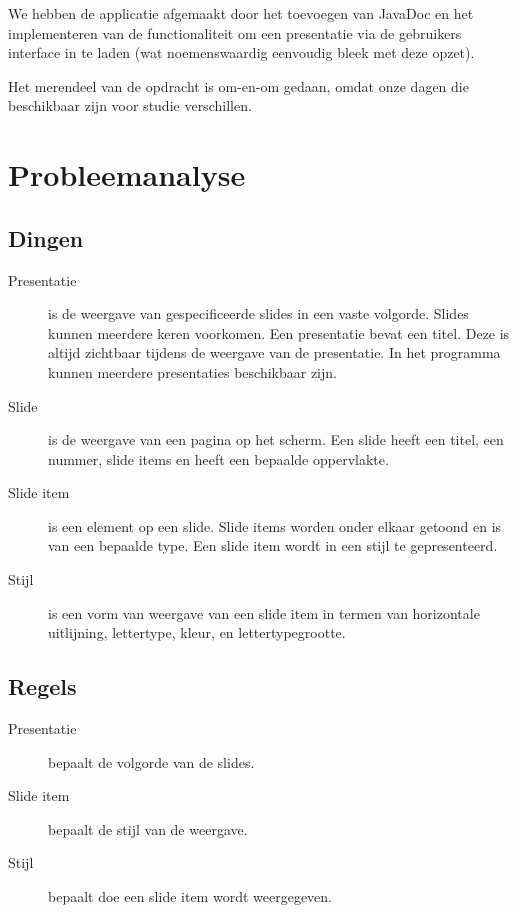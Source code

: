 \documentclass[a4paper]{article}
\begin{document}
\par
We hebben de applicatie afgemaakt door het toevoegen van JavaDoc en het implementeren van de functionaliteit om een presentatie via de gebruikers interface in te laden (wat noemenswaardig eenvoudig bleek met deze opzet).
\par
Het merendeel van de opdracht is om-en-om gedaan, omdat onze dagen die beschikbaar zijn voor studie verschillen.

\section{Probleemanalyse}
\subsection{Dingen}
\begin{description}
\item[Presentatie] is de weergave van gespecificeerde slides in een vaste volgorde. Slides kunnen meerdere keren voorkomen. Een presentatie bevat een titel. Deze is altijd zichtbaar tijdens de weergave van de presentatie. In het programma kunnen meerdere presentaties beschikbaar zijn.
\item[Slide] is de weergave van een pagina op het scherm. Een slide heeft een titel, een nummer, slide items en heeft een bepaalde oppervlakte.
\item[Slide item] is een element op een slide. Slide items worden onder elkaar getoond en is van een bepaalde type.
Een slide item wordt in een stijl te gepresenteerd.
\item[Stijl] is een vorm van weergave van een slide item in termen van horizontale uitlijning, lettertype, kleur, en lettertypegrootte.
\end{description}

\subsection{Regels}
\begin{description}
\item[Presentatie] bepaalt de volgorde van de slides.
\item[Slide item] bepaalt de stijl van de weergave.
\item[Stijl] bepaalt doe een slide item wordt weergegeven. 
\end{description}
\end{document}
